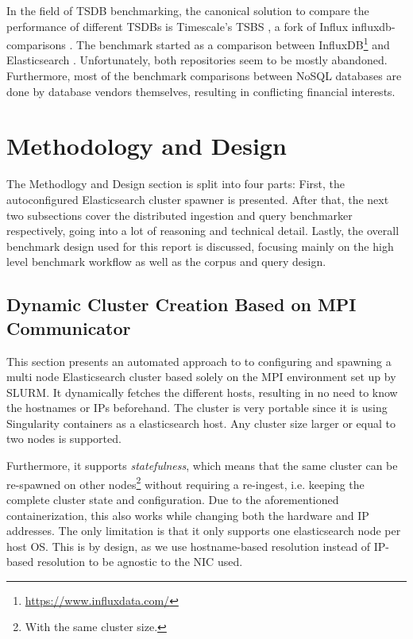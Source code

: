 In the field of \ac{TSDB} benchmarking, the canonical solution to compare the performance of different \acp{TSDB} is Timescale's \ac{TSBS} \cite{tsbs}, a fork of Influx influxdb-comparisons \cite{ifdbcomp}. The benchmark started as a comparison between InfluxDB\footnote{\url{https://www.influxdata.com/}} and Elasticsearch \cite{ifdbes}. Unfortunately, both repositories seem to be mostly abandoned.\\

Furthermore, most of the benchmark comparisons between NoSQL databases are done by database vendors themselves, resulting in conflicting financial interests.

\section{Methodology and Design}
The Methodlogy and Design section is split into four parts: First, the autoconfigured Elasticsearch cluster spawner is presented. After that, the next two subsections cover the distributed ingestion and query benchmarker respectively, going into a lot of reasoning and technical detail. Lastly, the overall benchmark design used for this report is discussed, focusing mainly on the high level benchmark workflow as well as the corpus and query design.

\subsection{Dynamic Cluster Creation Based on MPI Communicator}
This section presents an automated approach to to configuring and spawning a multi node Elasticsearch cluster based solely on the \ac{MPI} environment set up by SLURM. It dynamically fetches the different hosts, resulting in no need to know the hostnames or IPs beforehand. The cluster is very portable since it is using Singularity \cite{singularity} containers as a elasticsearch host. Any cluster size larger or equal to two nodes is supported.

Furthermore, it supports \emph{statefulness}, which means that the same cluster can be re-spawned on other nodes\footnote{With the same cluster size.} without requiring a re-ingest, i.e. keeping the complete cluster state and configuration. Due to the aforementioned containerization, this also works while changing both the hardware and IP addresses. The only limitation is that it only supports one elasticsearch node per host OS. This is by design, as we use hostname-based resolution instead of IP-based resolution to be agnostic to the \ac{NIC} used. 


